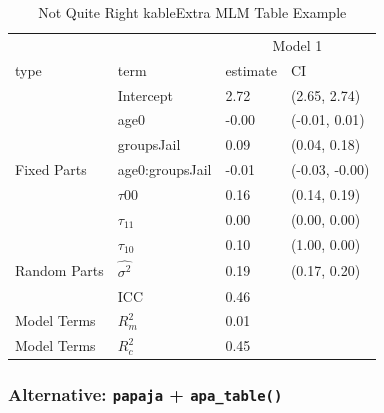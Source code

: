 \documentclass[]{article}
\newenvironment{Shaded}{\begin{snugshade}}{\end{snugshade}}
\newcommand{\KeywordTok}[1]{\textcolor[rgb]{0.13,0.29,0.53}{\textbf{#1}}}
\newcommand{\DataTypeTok}[1]{\textcolor[rgb]{0.13,0.29,0.53}{#1}}
\newcommand{\DecValTok}[1]{\textcolor[rgb]{0.00,0.00,0.81}{#1}}
\newcommand{\StringTok}[1]{\textcolor[rgb]{0.31,0.60,0.02}{#1}}
\newcommand{\OperatorTok}[1]{\textcolor[rgb]{0.81,0.36,0.00}{\textbf{#1}}}
\newcommand{\NormalTok}[1]{#1}
\begin{document}
\begin{table}

\caption{\label{tab:unnamed-chunk-27}Not Quite Right kableExtra MLM Table Example}
\centering
\begin{tabular}[t]{llll}
\toprule
\multicolumn{1}{c}{ } & \multicolumn{1}{c}{ } & \multicolumn{2}{c}{Model 1} \\
\cmidrule(l{2pt}r{2pt}){3-4}
type & term & estimate & CI\\
\midrule
 & Intercept & 2.72 & (2.65, 2.74)\\
\cmidrule{2-4}
 & age0 & -0.00 & (-0.01, 0.01)\\
\cmidrule{2-4}
 & groupsJail & 0.09 & (0.04, 0.18)\\
\cmidrule{2-4}
\multirow{-4}{*}{\raggedright\arraybackslash Fixed Parts} & age0:groupsJail & -0.01 & (-0.03, -0.00)\\
\cmidrule{1-4}
 & $\tau{00}$ & 0.16 & (0.14, 0.19)\\
\cmidrule{2-4}
 & $\tau_{11}$ & 0.00 & (0.00, 0.00)\\
\cmidrule{2-4}
 & $\tau_{10}$ & 0.10 & (1.00, 0.00)\\
\cmidrule{2-4}
Random Parts & $\hat{\sigma^2}$ & 0.19 & (0.17, 0.20)\\
 & ICC & 0.46 & \\
\cmidrule{2-4}
Model Terms & $R^2_m$ & 0.01 & \\
Model Terms & $R^2_c$ & 0.45 & \\
\bottomrule
\end{tabular}
\end{table}

\subsubsection{\texorpdfstring{Alternative: \texttt{papaja} +
\texttt{apa\_table()}}{Alternative: papaja + apa\_table()}}\label{alternative-papaja-apa_table}

\small

\begin{Shaded}
\end{Shaded}
\end{document}
